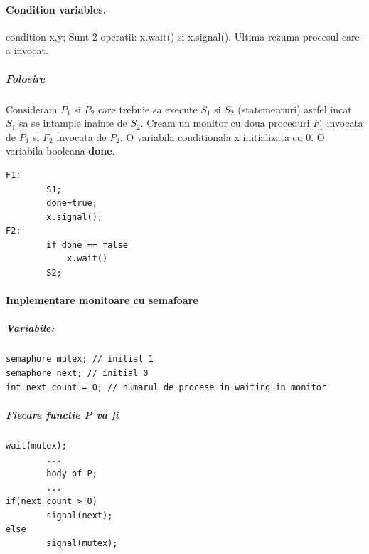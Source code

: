 \documentclass{article}
\begin{document}
\paragraph*{Condition variables.} condition x,y; Sunt 2 operatii: x.wait() si x.signal(). Ultima rezuma procesul care a invocat.
\subparagraph*{Folosire} Consideram $P_1$ si $P_2$ care trebuie sa execute $S_1$ si $S_2$ (statementuri) astfel incat $S_1$ sa se intample inainte de $S_2$. Cream un monitor cu doua proceduri $F_1$ invocata de $P_1$ si $F_2$ invocata de $P_2$. O variabila conditionala x initializata cu 0. O variabila booleana \textbf{done}.

\begin{center}
    \begin{lstlisting}
F1:
        S1;
        done=true;
        x.signal();
F2:
        if done == false
            x.wait()
        S2;
    \end{lstlisting}
\end{center}

\paragraph*{Implementare monitoare cu semafoare}
\subparagraph*{Variabile:}
\begin{center}
    \begin{lstlisting}
semaphore mutex; // initial 1
semaphore next; // initial 0
int next_count = 0; // numarul de procese in waiting in monitor
    \end{lstlisting}
\end{center}

\subparagraph*{Fiecare functie P va fi }
\begin{center}
    \begin{lstlisting}
wait(mutex);
        ...
        body of P;
        ...
if(next_count > 0)
        signal(next);
else
        signal(mutex);
    \end{lstlisting}
\end{center}
\end{document}

